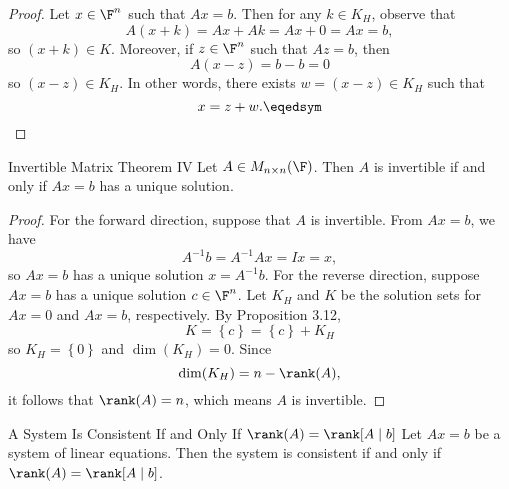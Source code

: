 \documentclass[linearalgebraI]{subfiles}
\begin{document}
    \begin{proof}
        Let $x\in \F^n$ such that $Ax=b$. Then for any $k\in K_H$, observe that
        \begin{equation*}
            A(x+k) = Ax+Ak = Ax + 0 = Ax = b,
        \end{equation*}
        so $(x+k)\in K$. Moreover, if $z\in \F^n$ such that $Az = b$, then
        \begin{equation*}
            A(x-z) = b-b = 0
        \end{equation*}
        so $(x-z)\in K_H$. In other words, there exists $w = (x-z)\in K_H$ such that
        \begin{equation*}
            x = z + w. \eqedsym
        \end{equation*}
    \end{proof}

    \begin{theorem}{Invertible Matrix Theorem IV}
        Let $A\in M_{n\times n}(\F)$. Then $A$ is invertible if and only if $Ax=b$ has a unique solution.
    \end{theorem}

    \begin{proof}
        For the forward direction, suppose that $A$ is invertible. From $Ax=b$, we have
        \begin{equation*}
            A^{-1}b = A^{-1}Ax = Ix = x,
        \end{equation*}
        so $Ax=b$ has a unique solution $x=A^{-1}b$. For the reverse direction, suppose $Ax=b$ has a unique solution $c\in \F^n$. Let $K_H$ and $K$ be the solution sets for $Ax=0$ and $Ax=b$, respectively. By Proposition 3.12,
        \begin{equation*}
            K = \left\lbrace c \right\rbrace = \left\lbrace c \right\rbrace + K_H
        \end{equation*}
        so $K_H = \left\lbrace 0 \right\rbrace$ and $\dim(K_H) = 0$. Since
        \begin{equation*}
            \dim(K_H) = n - \rank(A),
        \end{equation*}
        it follows that $\rank(A) = n$, which means $A$ is invertible.
    \end{proof}

    \begin{prop}{A System Is Consistent If and Only If $\rank(A) = \rank [A\mid b]$}
        Let $Ax = b$ be a system of linear equations. Then the system is consistent if and only if $\rank(A) = \rank[A\mid b]$.
    \end{prop}
\end{document}
